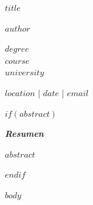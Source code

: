 \documentclass[spanish,11pt,onecolumn,letterpaper,table]{article}
\renewenvironment{abstract}{
    \begin{center}
        \small\itshape\bfseries Resumen
    \end{center}
    \quotation\small\itshape
}{
    \endquotation
}
\begin{document}
\begin{center}
    \vspace*{0.5cm}
    {\huge \bfseries $title$ \par}
    \vspace{1.2cm}
    {\large \bfseries $author$ \par}
    \vspace{0.3cm}
    {\itshape $degree$ \\
    $course$ \\
    $university$ \par}
    \vspace{0.8cm}
    {\small $location$ | $date$ | \texttt{$email$} \par}
    \vspace{1cm}
\end{center}

$if(abstract)$
\begin{abstract}
$abstract$
\end{abstract}
$endif$

$body$
\end{document}
